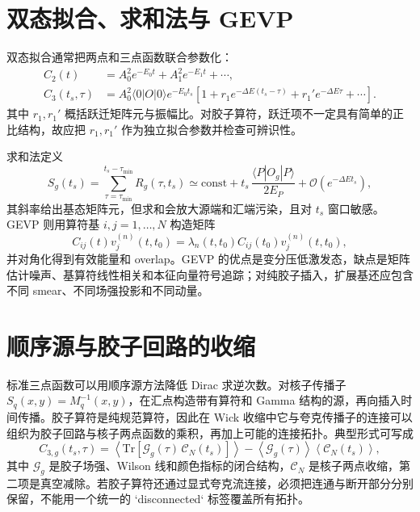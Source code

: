 \documentclass[UTF8,12pt,a4paper,twoside,openany]{ctexbook}
\begin{document}
\section{双态拟合、求和法与 GEVP}

双态拟合通常把两点和三点函数联合参数化：
\begin{align}
  C_2(t)&=A_0^2e^{-E_0t}
  +A_1^2e^{-E_1t}+\cdots,
  \label{eq:two-state}\\
  C_3(t_s,\tau)&=A_0^2\langle0|O|0\rangle
  e^{-E_0t_s}\left[1+
  r_1e^{-\Delta E(t_s-\tau)}
  +r_1'e^{-\Delta E\tau}
  +\cdots\right].
  \label{eq:three-state}
\end{align}
其中 \(r_1,r_1'\) 概括跃迁矩阵元与振幅比。对胶子算符，跃迁项不一定具有简单的正比结构，故应把 \(r_1,r_1'\) 作为独立拟合参数并检查可辨识性。

求和法定义
\begin{equation}
  S_g(t_s)=\sum_{\tau=\tau_{\min}}^{t_s-\tau_{\min}}
  R_g(\tau,t_s)
  \simeq \text{const}
  +t_s\,\frac{\langle P|O_g|P\rangle}{2E_P}
  +\mathcal O(e^{-\Delta Et_s}),
  \label{eq:summation}
\end{equation}
其斜率给出基态矩阵元，但求和会放大源端和汇端污染，且对 \(t_s\) 窗口敏感。GEVP 则用算符基 \(i,j=1,\dots,N\) 构造矩阵
\begin{equation}
  C_{ij}(t)v_j^{(n)}(t,t_0)
  =\lambda_n(t,t_0)C_{ij}(t_0)v_j^{(n)}(t,t_0),
  \label{eq:gevp}
\end{equation}
并对角化得到有效能量和 overlap。GEVP 的优点是变分压低激发态，缺点是矩阵估计噪声、基算符线性相关和本征向量符号追踪；对纯胶子插入，扩展基还应包含不同 smear、不同场强投影和不同动量。

\section{顺序源与胶子回路的收缩}

标准三点函数可以用顺序源方法降低 Dirac 求逆次数。对核子传播子 \(S_q(x,y)=M_q^{-1}(x,y)\)，在汇点构造带有算符和 Gamma 结构的源，再向插入时间传播。胶子算符是纯规范算符，因此在 Wick 收缩中它与夸克传播子的连接可以组织为胶子回路与核子两点函数的乘积，再加上可能的连接拓扑。典型形式可写成
\begin{equation}
  C_{3,g}(t_s,\tau)
  =\left\langle
  \mathrm{Tr}\left[
  \mathcal G_g(\tau)\,\mathcal C_N(t_s)
  \right]\right\rangle
  -\left\langle\mathcal G_g(\tau)\right\rangle
  \left\langle\mathcal C_N(t_s)\right\rangle ,
  \label{eq:disconnected}
\end{equation}
其中 \(\mathcal G_g\) 是胶子场强、Wilson 线和颜色指标的闭合结构，\(\mathcal C_N\) 是核子两点收缩，第二项是真空减除。若胶子算符还通过显式夸克流连接，必须把连通与断开部分分别保留，不能用一个统一的 `disconnected` 标签覆盖所有拓扑。
\end{document}
